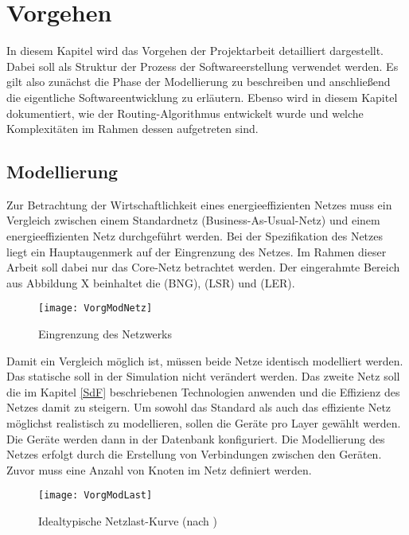 \section{Vorgehen}
In diesem Kapitel wird das Vorgehen der Projektarbeit detailliert dargestellt. Dabei soll als Struktur der Prozess der Softwareerstellung verwendet werden. Es gilt also zunächst die Phase der Modellierung zu beschreiben und anschließend die eigentliche Softwareentwicklung zu erläutern. Ebenso wird in diesem Kapitel dokumentiert, wie der Routing-Algorithmus entwickelt wurde und welche Komplexitäten im Rahmen dessen aufgetreten sind.

\subsection{Modellierung}
Zur Betrachtung der Wirtschaftlichkeit eines energieeffizienten Netzes muss ein Vergleich zwischen einem Standardnetz (Business-As-Usual-Netz) und einem energieeffizienten Netz durchgeführt werden. Bei der Spezifikation des Netzes liegt ein Hauptaugenmerk auf der Eingrenzung des Netzes. Im Rahmen dieser Arbeit soll dabei nur das Core-Netz betrachtet werden. Der eingerahmte Bereich aus Abbildung X beinhaltet die  (BNG),  (LSR) und  (LER).


\begin{figure}[!ht]
	\centering
	\texttt{[image: VorgModNetz]}
	\caption{Eingrenzung des Netzwerks} 
	\label{fig:VorgModNetz}
\end{figure}


Damit ein Vergleich möglich ist, müssen beide Netze identisch modelliert werden. Das statische soll in der Simulation nicht  verändert werden. Das zweite Netz soll die im Kapitel \ref{SdF} beschriebenen Technologien anwenden und die Effizienz des Netzes damit zu steigern. Um sowohl das Standard als auch das effiziente Netz möglichst realistisch zu modellieren, sollen die Geräte pro Layer gewählt werden. Die Geräte werden dann in der Datenbank konfiguriert. Die Modellierung des Netzes erfolgt durch die Erstellung von Verbindungen zwischen den Geräten. Zuvor muss eine Anzahl von Knoten im Netz definiert werden. 

\begin{figure}[!ht]
	\centering
	\texttt{[image: VorgModLast]}
	\caption{Idealtypische Netzlast-Kurve (nach \cite[3]{Chiaraviglio2009})} 
	\label{fig:VorgModLast}
\end{figure}


